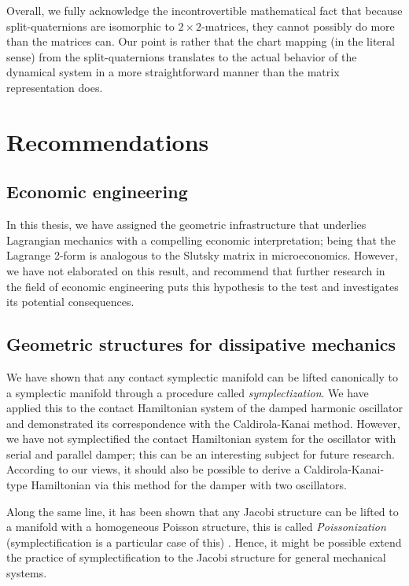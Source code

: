 Overall, we fully acknowledge the incontrovertible mathematical fact that because split-quaternions are isomorphic to $2\times2$-matrices, they cannot possibly do more than the matrices can. Our point is rather that the chart mapping (in the literal sense) from the split-quaternions translates to the actual behavior of the dynamical system in a more straightforward manner than the matrix representation does.

\section*{Recommendations}

\subsection*{Economic engineering}
In this thesis, we have assigned the geometric infrastructure that underlies Lagrangian mechanics with a compelling economic interpretation; being that the Lagrange 2-form is analogous to the Slutsky matrix in microeconomics. However, we have not elaborated on this result, and recommend that further research in the field of economic engineering puts this hypothesis to the test and investigates its potential consequences.

\subsection*{Geometric structures for dissipative mechanics}
We have shown that any contact symplectic manifold can be lifted canonically to a symplectic manifold through a procedure called \emph{symplectization}. We have applied this to the contact Hamiltonian system of the damped harmonic oscillator and demonstrated its correspondence with the Caldirola-Kanai method. However, we have not symplectified the contact Hamiltonian system for the oscillator with serial and parallel damper; this can be an interesting subject for future research. According to our views, it should also be possible to derive a Caldirola-Kanai-type Hamiltonian via this method for the damper with two oscillators.

Along the same line, it has been shown that any Jacobi structure can be lifted to a manifold with a homogeneous Poisson structure, this is called \emph{Poissonization} (symplectification is a particular case of this) \cite{marle1991}. Hence, it might be possible extend the practice of symplectification to the Jacobi structure for general mechanical systems. 

